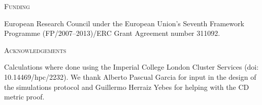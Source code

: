 \documentclass[12pt,letterpaper]{article}
\renewcommand{\section}[1]{%
\bigskip
\begin{center}
\begin{Large}
\normalfont\scshape #1
\medskip
\end{Large}
\end{center}}
\begin{document}
\section{Funding}
European Research Council under the European Union’s Seventh Framework Programme (FP/2007–2013)/ERC Grant Agreement number 311092.

\section{Acknowledgements}
Calculations where done using the Imperial College London Cluster Services (doi: 10.14469/hpc/2232).
We thank Alberto Pascual Garcia for input in the design of the simulations protocol and Guillermo Herraiz Yebes for helping with the CD metric proof.



\end{document}
